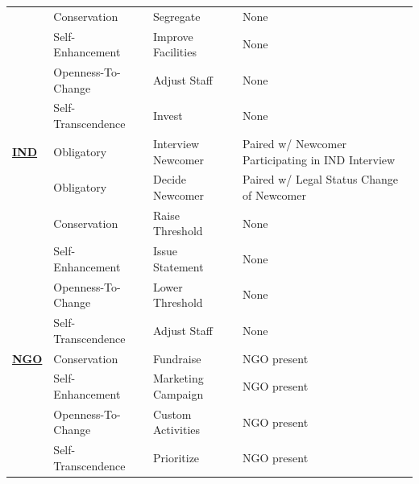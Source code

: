 \documentclass{scspaperproc}
\theoremstyle{scsthe}
\begin{document}
\begin{table}[ht]
\begin{center}
{\begin{tabular}{| llll |}
                        & Conservation       & Segregate              & None                                                                                                \\
                        & Self-Enhancement   & Improve Facilities     & None                                                                                                \\
                        & Openness-To-Change & Adjust Staff           & None                                                                                                \\
                        & Self-Transcendence & Invest                 & None                                                                                                \\
\hline 
{\ul \textbf{IND}}    & Obligatory   & Interview Newcomer      & Paired w/ Newcomer Participating in IND Interview \\
                         & Obligatory & Decide Newcomer         & Paired w/ Legal Status Change of Newcomer         \\
                        & Conservation       & Raise Threshold        & None                                                                                                \\
                        & Self-Enhancement   & Issue Statement        & None                                                                                                \\
                        & Openness-To-Change & Lower Threshold        & None                                                                                                \\
                        & Self-Transcendence & Adjust Staff           & None                                                                                                \\
 \hline 
{\ul \textbf{NGO}}      & Conservation       & Fundraise              & NGO present                                                                                         \\
                        & Self-Enhancement   & Marketing Campaign     & NGO present                                                                                         \\
                        & Openness-To-Change & Custom Activities      & NGO present                                                                                         \\
                        & Self-Transcendence & Prioritize             & NGO present                \\                                                                                        
 \hline 
\end{tabular}}
\end{center}
\end{table}
\end{document}
